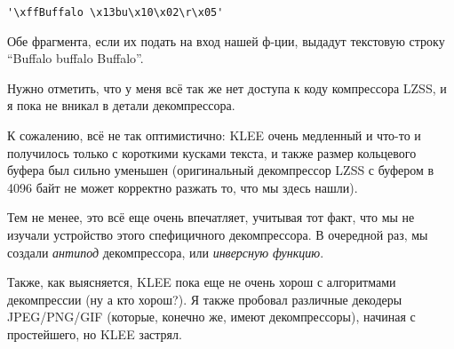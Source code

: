 \begin{lstlisting}
'\xffBuffalo \x13bu\x10\x02\r\x05'
\end{lstlisting}

Обе фрагмента, если их подать на вход нашей ф-ции, выдадут текстовую строку ``Buffalo buffalo Buffalo''.

Нужно отметить, что у меня всё так же нет доступа к коду компрессора \ac{LZSS}, и я пока не вникал в детали декомпрессора.

К сожалению, всё не так оптимистично:
KLEE очень медленный и что-то и получилось только с короткими кусками текста, и также размер кольцевого буфера был сильно
уменьшен (оригинальный декомпрессор \ac{LZSS} с буфером в 4096 байт не может корректно разжать то, что мы здесь нашли).

Тем не менее, это всё еще очень впечатляет, учитывая тот факт, что мы не изучали устройство этого спефицичного декомпрессора.
В очередной раз, мы создали \textit{антипод} декомпрессора, или \textit{инверсную функцию}.

Также, как выясняется, KLEE пока еще не очень хорош с алгоритмами декомпрессии (ну а кто хорош?).
Я также пробовал различные декодеры JPEG/PNG/GIF (которые, конечно же, имеют декомпрессоры), начиная с простейшего,
но KLEE застрял.

